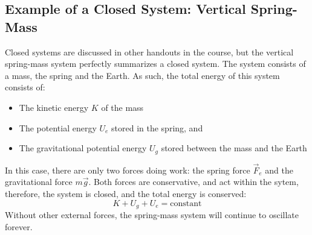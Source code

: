 \documentclass[11pt]{article}
\begin{document}
\subsection{Example of a Closed System: Vertical Spring-Mass}
Closed systems are discussed in other handouts in the course, but the
vertical spring-mass system perfectly summarizes a closed system. The system
consists of a mass, the spring and the Earth. As such, the total energy of this
system consists of:
\begin{itemize}[nosep]
\item The kinetic energy $K$ of the mass
\item The potential energy $U_e$ stored in the spring, and
\item The gravitational potential energy $U_g$ stored between the mass and the
  Earth
\end{itemize}
In this case, there are only two forces doing work: the spring force $\vec F_e$
and the gravitational force $m\vec g$. Both forces are conservative, and act
within the sytem, therefore, the system is closed, and the total energy is
conserved:
\begin{equation}
  K + U_g + U_e=\text{constant}
\end{equation}
Without other external forces, the spring-mass system will continue to oscillate
forever.
\end{document}
